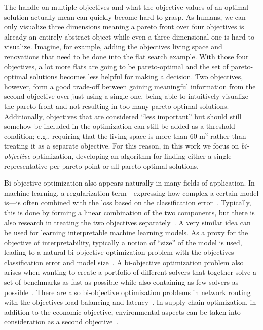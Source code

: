 
The handle on multiple objectives and what the objective values of an optimal solution actually mean can quickly become hard to grasp.
As humans, we can only visualize three dimensions meaning a pareto front over four objectives is already an entirely abstract object while even a three-dimensional one is hard to visualize.
Imagine, for example, adding the objectives living space and renovations that need to be done into the flat search example.
With those four objectives, a lot more flats are going to be pareto-optimal and the set of pareto-optimal solutions becomes less helpful for making a decision.
Two objectives, however, form a good trade-off between gaining meaningful information from the second objective over just using a single one, being able to intuitively visualize the pareto front and not resulting in too many pareto-optimal solutions.
Additionally, objectives that are considered ``less important'' but should still somehow be included in the optimization can still be added as a threshold condition;
e.g., requiring that the living space is more than 60 $\text{m}^2$ rather than treating it as a separate objective.
For this reason, in this work we focus on \emph{bi-objective} optimization, developing an algorithm for finding either a single representative per pareto point or all pareto-optimal solutions.

Bi-objective optimization also appears naturally in many fields of application.
In machine learning, a regularization term---expressing how complex a certain model is---is often combined with the loss based on the classification error~\autocite{}.
Typically, this is done by forming a linear combination of the two components, but there is also research in treating the two objectives separately~\autocite{DBLP:journals/tsmc/JinS08}.
A very similar idea can be used for learning interpretable machine learning models.
As a proxy for the objective of interpretability, typically a notion of ``size'' of the model is used, leading to a natural bi-objective optimization problem with the objectives classification error and model size~\autocite{DBLP:conf/ijcai/Ignatiev0NS21,DBLP:conf/cp/MaliotovM18,DBLP:conf/ijcai/NarodytskaIPM18,DBLP:conf/ijcai/Hu0HH20,DBLP:conf/cp/YuISB20,DBLP:conf/aaai/Ignatiev0S021}.
A bi-objective optimization problem also arises when wanting to create a portfolio of different solvers that together solve a set of benchmarks as fast as possible while also containing as few solvers as possible~\autocite{DBLP:conf/cp/JanotaMSM21}.
There are also bi-objective optimization problems in network routing with the objectives load balancing and latency~\autocite{SilverioEtAl2022biobjectiveoptimization}.
In supply chain optimization, in addition to the economic objective, environmental aspects can be taken into consideration as a second objective~\autocite{DBLP:journals/cce/Pinto-VarelaBN11}.

